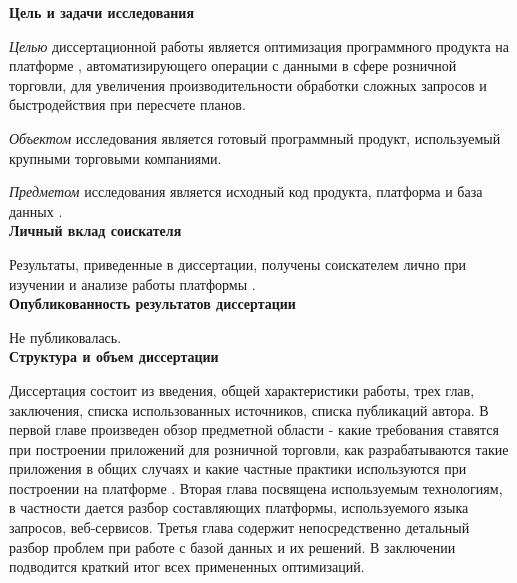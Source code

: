 
\textbf{Цель и задачи исследования}

\emph{Целью} диссертационной работы является  оптимизация программного продукта на платформе \LB, автоматизирующего операции с данными в сфере розничной торговли, для увеличения производительности обработки сложных запросов и быстродействия при пересчете планов.

\emph{Объектом} исследования является готовый программный продукт, используемый крупными торговыми компаниями.

\emph{Предметом} исследования является исходный код продукта, платформа и база данных \LB.\\



\textbf{Личный вклад соискателя}

Результаты, приведенные в диссертации, получены соискателем лично при изучении и анализе работы платформы \LB.\\


\textbf{Опубликованность результатов диссертации}

Не публиковалась.\\

\textbf{Структура и объем диссертации}

Диссертация состоит из введения, общей характеристики работы, трех глав, заключения, списка использованных источников, списка публикаций автора. В первой главе произведен обзор предметной области - какие требования ставятся при построении приложений для розничной торговли, как разрабатываются такие приложения в общих случаях и какие частные практики используются при построении на платформе \LB. Вторая глава посвящена используемым технологиям, в частности дается разбор составляющих платформы, используемого языка запросов, веб-сервисов. Третья глава содержит непосредственно детальный разбор проблем при работе с базой данных и их решений. В заключении подводится краткий итог всех примененных оптимизаций.


